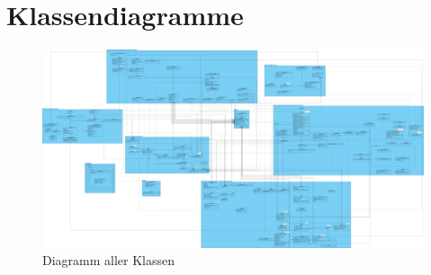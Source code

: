 \chapter{Klassendiagramme}
\label{ch:klassendiagramme}

\begin{figure}[hb]
  \centering
  \includegraphics[width=380pt]{resourcen/MainDiagramm.png}
  \caption{Diagramm aller Klassen}
  \label{fig:mainDiagramm}
\end{figure}